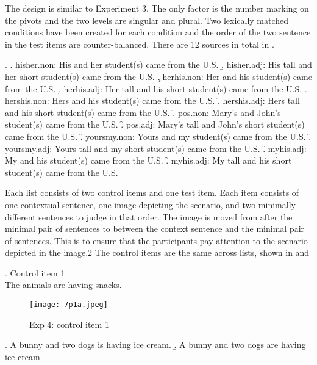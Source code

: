 \documentclass[
  11pt          %
  ,letterpaper  %
  ,center       %
  ,noupper      %
  ]{uconnthesis2}
\begin{document}
The design is similar to Experiment 3. The only factor is the number marking on the pivots and the two levels are singular and plural.  Two lexically matched conditions have been created for each condition and the order of the two sentence in the test items are counter-balanced. There are 12 sources in total in \Next.


\ex.
\a. hisher.non: His and her student(s) came from the U.S.
\b. hisher.adj: His tall and her short student(s) came from the U.S.
\c. herhis.non: Her and his student(s) came from the U.S.
\d. herhis.adj: Her tall and his short student(s) came from the U.S.
\e. hershis.non: Hers and his student(s) came from the U.S.
\f. hershis.adj: Hers tall and his short student(s) came from the U.S.
\f. pos.non: Mary's and John's student(s) came from the U.S.
\f. pos.adj: Mary's tall and John's short student(s) came from the U.S.
\f. yoursmy.non: Yours and my student(s) came from the U.S.
\f. yoursmy.adj: Yours tall and my short student(s) came from the U.S.
\f. myhis.adj: My and his student(s) came from the U.S.
\f. myhis.adj: My tall and his short student(s) came from the U.S.

Each list consists of two control items and one test item. Each item consists of one contextual sentence, one image depicting the scenario, and two minimally different sentences to judge in that order. The image is moved from after the minimal pair of sentences to between the context sentence and the minimal pair of sentences. This is to ensure that the participants pay attention to the scenario depicted in the image.2 The control items are the same across lists, shown in \Next and \NNext

\ex. Control item 1\\
The animals are having snacks.\\
\vspace{-0.5em}
\begin{figure}[htb!] 
\texttt{[image: 7p1a.jpeg]} \centering
\caption{Exp 4: control item 1}
\label{fig:exp4a}
\end{figure}\vspace{-0.5em}
\a. A bunny and two dogs is having ice cream.
\b. A bunny and two dogs are having ice cream.
\end{document}
